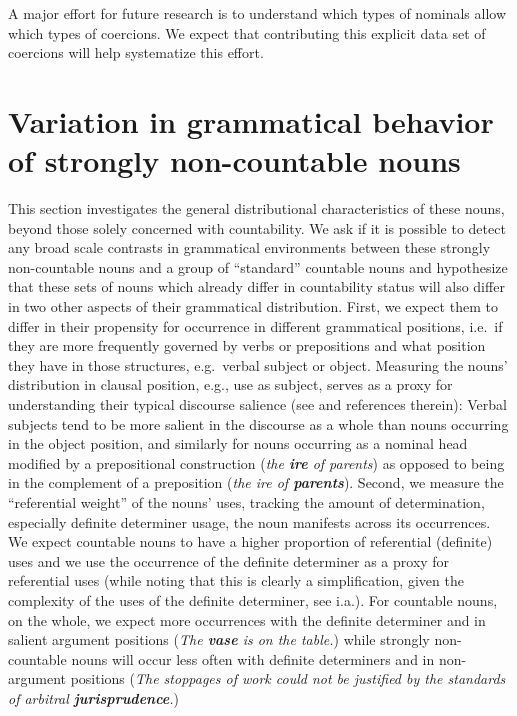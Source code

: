 \documentclass[output=paper]{langscibook}
\begin{document}
A major effort for  future research is to understand which types of nominals allow which types of coercions.  We expect that contributing this explicit data set of coercions will help systematize this effort.






\section{Variation in grammatical behavior of strongly non-countable nouns}\label{gri-ric:sec:quantitative} 

This section investigates the general distributional characteristics of these nouns, beyond those solely concerned with countability.  We ask if it is possible to detect any broad scale contrasts in grammatical environments between these strongly non-countable nouns  and a group of ``standard'' countable nouns and hypothesize that these sets of nouns which already differ in countability status will also differ in two other aspects of their grammatical distribution.  First, we expect them to differ in their propensity for occurrence in different grammatical positions, i.e.\ if they are more frequently governed by verbs or prepositions and what position they have in those structures, e.g.\ verbal subject or object. Measuring the nouns' distribution in clausal position, e.g., use as subject, serves as a proxy for understanding their typical discourse salience (see \citealt{kaiser2006effects} and references therein): Verbal subjects tend to be more salient in the discourse as a whole than nouns occurring in the object position, and similarly for nouns occurring as a nominal head modified by a prepositional construction (\textit{the \textbf{ire} of parents}) as opposed to being in the complement of a preposition (\textit{the ire of \textbf{parents}}).  Second, we measure the ``referential weight'' of the nouns' uses, tracking the amount of determination, especially definite determiner usage, the noun manifests across its occurrences.  We expect countable nouns to have a higher proportion of referential (definite) uses and we use the occurrence of the definite determiner as a proxy for referential uses (while noting that this is clearly a simplification, given the complexity of the uses of the definite determiner, see \citealt{lyons1999definiteness} i.a.).  For countable nouns, on the whole, we expect more occurrences with the definite determiner and in salient argument positions (\textit{The \textbf{vase} is on the table.}) while strongly non-countable nouns will occur less often with definite determiners and in non-argument positions (\textit{The stoppages of work could not be justified by the standards of arbitral \textbf{jurisprudence}.})
\end{document}
